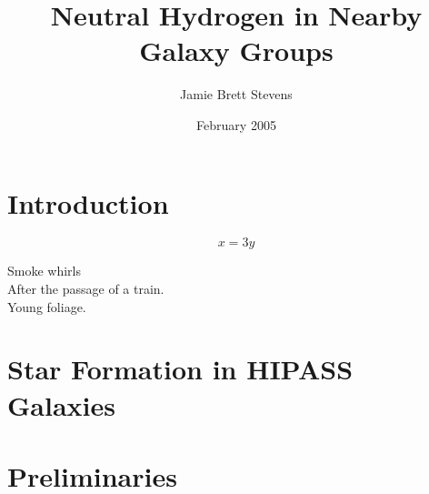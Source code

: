 \message{ !name(thesis.tex)}\documentclass{book}
\begin{document}

\author{Jamie Brett Stevens}
\title{Neutral Hydrogen in Nearby Galaxy Groups}
\date{February 2005}
\maketitle
\chapter*{Introduction}  %
\begin{equation}
  x=3y
\end{equation}
\begin{savequote}[10pc]
\sffamily
Smoke whirls\\
After the passage of a train.\\
Young foliage.
\end{savequote}
\chapter{Star Formation in HIPASS Galaxies}\label{sfringalaxies}
\chapter{Preliminaries}  %

% 
\end{document}
